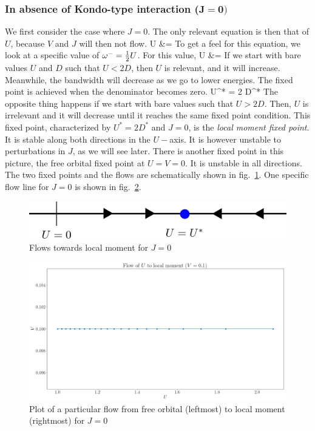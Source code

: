 \documentclass[14pt]{extarticle}
\numberwithin{equation}{section}
\begin{document}
\subsubsection*{In absence of Kondo-type interaction (\(\pmb{J=0})\)}
We first consider the case where \(J=0\). The only relevant equation is then that of \(U\), because \(V\) and \(J\) will then not flow.
\beq
\Delta U &= 
\eeq
To get a feel for this equation, we look at a specific value of \(\omega^- = \frac{1}{2} U\). For this value,
\beq
\Delta U &= 
\eeq
If we start with bare values \(U\) and \(D\) such that \(U <  2D\), then \(U\) is relevant, and it will increase. Meanwhile, the bandwidth will decrease as we go to lower energies. The fixed point is achieved when the denominator becomes zero.
\beq
U^* = 2 D^*
\eeq
The opposite thing happens if we start with bare values such that  \(U >  2D\). Then, \(U\) is irrelevant and it will decrease until it reaches the same fixed point condition. This fixed point, characterized by \(U^* = 2 D^*\) and \(J=0\), is the \textit{local moment fixed point}. It is stable along both directions in the \(U-\)axis. It is however unstable to perturbations in \(J\), as we will see later.
\pb
There is another fixed point in this picture, the free orbital fixed point at \(U=V=0\). It is unstable in all directions. The two fixed points and the flows are schematically shown in fig.~\ref{lmflow}. One specific flow line for \(J=0\) is shown in fig.~\ref{fo2lm}.
\begin{figure}
\centering
\includegraphics[scale=0.5]{lmflow.png}
\caption{Flows towards local moment for \(J=0\)}
\label{lmflow}
\end{figure}
\begin{figure}
\centering
\includegraphics[scale=0.3]{fo2lm.png}
\caption{Plot of a particular flow from free orbital (leftmost) to local moment (rightmost) for \(J=0\)}
\label{fo2lm}
\end{figure}
\end{document}
